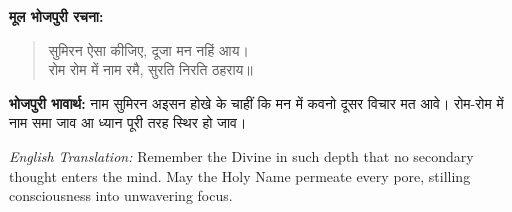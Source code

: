 \textbf{मूल भोजपुरी रचना:}

\begin{quote}
सुमिरन ऐसा कीजिए, दूजा मन नहिं आय।\\
रोम रोम में नाम रमै, सुरति निरति ठहराय॥
\end{quote}

\textbf{भोजपुरी भावार्थ:} नाम सुमिरन अइसन होखे के चाहीं कि मन में कवनो दूसर विचार मत आवे। रोम-रोम में नाम समा जाव आ ध्यान पूरी तरह स्थिर हो जाव।

\begin{sloppypar}
{\engfont \textit{English Translation:} Remember the Divine in such depth that no secondary thought enters the mind.
May the Holy Name permeate every pore, stilling consciousness into unwavering focus.}
\end{sloppypar}
